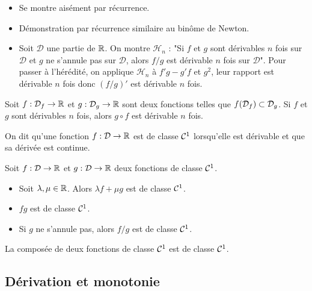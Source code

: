 \documentclass{magnolia}
\begin{document}
\begin{preuve}
\begin{itemize}
\item Se montre aisément par récurrence.
\item Démonstration par récurrence similaire au binôme de Newton.
\item Soit $\mathcal{D}$ une partie de $\mathbb{R}$. On montre $\mathcal{H}_n$ : "Si $f$ et $g$ sont dérivables $n$ fois sur $\mathcal{D}$ et $g$ ne s'annule pas sur $\mathcal{D}$, alors $f/g$ est dérivable $n$ fois sur $\mathcal{D}$".
Pour passer à l'hérédité, on applique $\mathcal{H}_n$ à $f'g-g'f$ et $g^2$, leur rapport est dérivable $n$ fois donc $(f/g)'$ est dérivable $n$ fois.
\end{itemize}
\end{preuve}

\begin{proposition}[utile=-3]
Soit $f:\mathcal{D}_f\to\mathbb{R}$ et $g:\mathcal{D}_g\to\mathbb{R}$ sont deux fonctions telles que
$f(\mathcal{D}_f)\subset\mathcal{D}_g$. Si $f$ et $g$ sont dérivables $n$ fois, alors $g\circ f$ est
dérivable $n$ fois.  
\end{proposition}

\begin{definition}
On dit qu'une fonction $f:\mathcal{D}\to\mathbb{R}$ est de classe $\mathcal{C}^{1}$ lorsqu'elle est
dérivable et que sa dérivée est continue.
\end{definition}

\begin{proposition}[utile=-3]
Soit $f:\mathcal{D}\to\mathbb{R}$ et $g:\mathcal{D}\to\mathbb{R}$ deux fonctions de classe $\mathcal{C}^{1}$.
\begin{itemize}
\item Soit $\lambda,\mu\in\mathbb{R}$. Alors $\lambda f+\mu g$ est de classe $\mathcal{C}^{1}$.
\item $fg$ est de classe $\mathcal{C}^{1}$.
\item Si $g$ ne s'annule pas, alors $f/g$ est de classe $\mathcal{C}^{1}$.
\end{itemize}
\end{proposition}

\begin{proposition}[utile=-3]
La composée de deux fonctions de classe $\mathcal{C}^{1}$ est de classe $\mathcal{C}^{1}$.
\end{proposition}

\subsection{Dérivation et monotonie}
\end{document}
